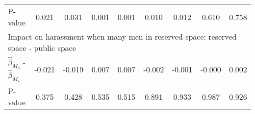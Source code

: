\begin{tabular}{l*{8}{c}}
\quad P-value       &       0.021         &       0.031         &       0.001         &       0.001         &       0.010         &       0.012         &       0.610         &       0.758         \\
\multicolumn{9}{l}{Impact on harassment when many men in reserved space: reserved space - public space} \\\quad $\hat\beta_{M_3}$ - $\hat\beta_{M_4}$&      -0.021         &      -0.019         &       0.007         &       0.007         &      -0.002         &      -0.001         &      -0.000         &       0.002         \\
\quad P-value       &       0.375         &       0.428         &       0.535         &       0.515         &       0.891         &       0.933         &       0.987         &       0.926         \\
\hline\hline \end{tabular}
